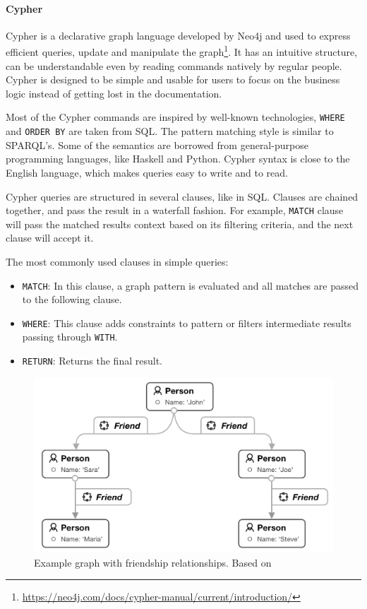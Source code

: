 \paragraph{Cypher}

Cypher is a declarative graph language developed by Neo4j and used to express efficient queries, update and manipulate the graph\footnote{\url{https://neo4j.com/docs/cypher-manual/current/introduction/}}.
It has an intuitive structure, can be understandable even by reading commands natively by regular people.
Cypher is designed to be simple and usable for users to focus on the business logic instead of getting lost in the documentation. 

Most of the Cypher commands are inspired by well-known technologies, \eg \texttt{WHERE} and \texttt{ORDER BY} are taken from SQL.
The pattern matching style is similar to SPARQL's.
Some of the semantics are borrowed from general-purpose programming languages, like Haskell and Python.
Cypher syntax is close to the English language, which makes queries easy to write and to read.

Cypher queries are structured in several clauses, like in SQL.
Clauses are chained together, and pass the result in a waterfall fashion.
For example, \texttt{MATCH} clause will pass the matched results context based on its filtering criteria, and the next clause will accept it.

The most commonly used clauses in simple queries:

\begin{itemize}
  \item \texttt{MATCH}: 
  In this clause, a graph pattern is evaluated and all matches are passed to the following clause.
  \item \texttt{WHERE}:
  This clause adds constraints to pattern or filters intermediate results passing through \texttt{WITH}.
  \item \texttt{RETURN}:
  Returns the final result.
\end{itemize}

\begin{figure}[!ht]
  \centering
  \includegraphics[scale=0.3]{figures/graph_cypher.png}
  \caption{Example graph with friendship relationships. Based on~\cite{neo4j_website}}
  \label{fig:graph_cypher}
\end{figure}

